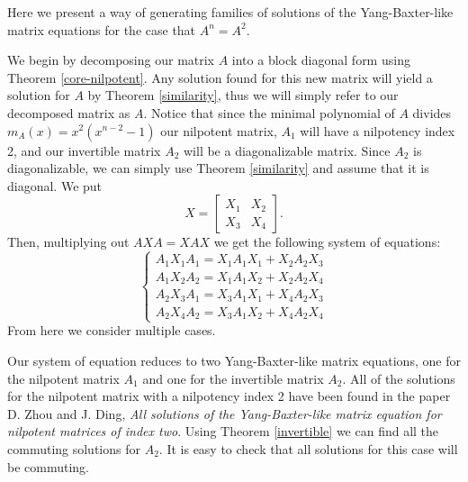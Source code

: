\documentclass{article}
\begin{document}
\begin{algorithm}
  Here we present a way of generating families of solutions of the Yang-Baxter-like matrix equations for the case that $A^n = A^2$.

  We begin by decomposing our matrix $A$ into a block diagonal form using Theorem \ref{core-nilpotent}.
  Any solution found for this new matrix will yield a solution for $A$ by Theorem \ref{similarity}, thus we will simply refer to our decomposed matrix as $A$.
  Notice that since the minimal polynomial of $A$ divides $m_A(x) = x^2 (x^{n - 2} - 1)$ our nilpotent matrix, $A_1$ will have a nilpotency index 2, and our invertible matrix $A_2$ will be a diagonalizable matrix.
  Since $A_2$ is diagonalizable, we can simply use Theorem \ref{similarity} and assume that it is diagonal.
  We put
  \[X = \begin{bmatrix} X_1 & X_2\\ X_3 & X_4 \end{bmatrix}.\]
  Then, multiplying out $A X A = X A X$ we get the following system of equations:
  \[\begin{cases}
    A_1 X_1 A_1 = X_1 A_1 X_1 + X_2 A_2 X_3\\
    A_1 X_2 A_2 = X_1 A_1 X_2 + X_2 A_2 X_4\\
    A_2 X_3 A_1 = X_3 A_1 X_1 + X_4 A_2 X_3\\
    A_2 X_4 A_2 = X_3 A_1 X_2 + X_4 A_2 X_4
  \end{cases}\]
  From here we consider multiple cases.

  \begin{case}[$X_2 = X_3 = 0$]
    Our system of equation reduces to two Yang-Baxter-like matrix equations, one for the nilpotent matrix $A_1$ and one for the invertible matrix $A_2$.
    All of the solutions for the nilpotent matrix with a nilpotency index 2 have been found in the paper D. Zhou and J. Ding, \textit{All solutions of the Yang-Baxter-like matrix equation for nilpotent matrices of index two}.
    Using Theorem \ref{invertible} we can find all the commuting solutions for $A_2$.
    It is easy to check that all solutions for this case will be commuting.
  \end{case}


\end{algorithm}
\end{document}
